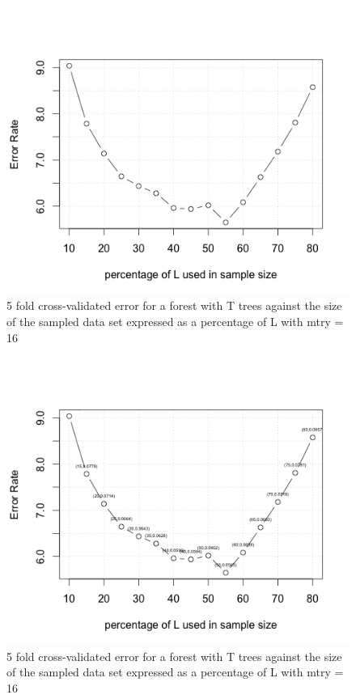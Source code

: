 \documentclass[12pt]{article}%
\begin{document}
\begin{figure}
\includegraphics{part4a.png}
\caption{5 fold cross-validated error for a forest with T trees against the size of the sampled data set expressed as a percentage of L with mtry = 16}
\end{figure}

\begin{figure}
\includegraphics{part41a.png}
\caption{5 fold cross-validated error for a forest with T trees against the size of the sampled data set expressed as a percentage of L with mtry = 16}
\end{figure}
\end{document}
